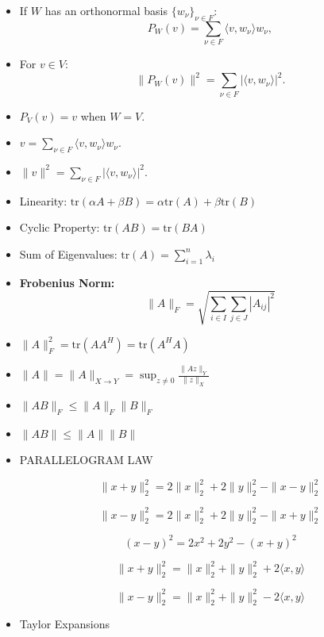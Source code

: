 \documentclass{article}
\begin{document}
\begin{itemize}
 \item If \( W \) has an orthonormal basis \( \{ w_\nu \}_{\nu \in F} \):
    \[
    P_W(v) = \sum_{\nu \in F} \langle v, w_\nu \rangle w_\nu,
    \]

 \item For \( v \in V \):
    \[
    \| P_W(v) \|^2 = \sum_{\nu \in F} |\langle v, w_\nu \rangle|^2.
    \]

 \item $P_V(v) = v$ when $W = V$.

 \item $v = \sum_{\nu \in F} \langle v, w_\nu \rangle w_\nu$.

 \item $\| v \|^2 = \sum_{\nu \in F} |\langle v, w_\nu \rangle|^2$.

 \item Linearity: $\text{tr}(\alpha A + \beta B) = \alpha \text{tr}(A) + \beta \text{tr}(B)$
    \item Cyclic Property: $\text{tr}(AB) = \text{tr}(BA)$
    \item Sum of Eigenvalues: $\text{tr}(A) = \sum_{i=1}^{n} \lambda_i$
 
\item \textbf{Frobenius Norm:}
    \[
    \| A \|_F = \sqrt{\sum_{i \in I} \sum_{j \in J} |A_{ij}|^2}
    \]

 \item 
    $
    \| A \|_F^2 = \text{tr}(AA^H) = \text{tr}(A^H A)
   $

\item 
$
\|A\| = \|A\|_{X \rightarrow Y} = \sup_{z \neq 0} \frac{\|Az\|_Y}{\|z\|_X}
$

\item 
$
\|AB\|_F \leq \|A\|_F \|B\|_F
$

\item $
\|AB\| \leq \|A\| \|B\|
$


\item PARALLELOGRAM LAW

\[
\|x + y\|^2_2 = 2 \|x\|^2_2 + 2 \|y\|^2_2 - \|x - y\|^2_2
\]

\[
\|x - y\|^2_2 = 2 \|x\|^2_2 + 2 \|y\|^2_2 - \|x + y\|^2_2
\]

\[
(x - y)^2 = 2x^2 + 2y^2 - (x + y)^2
\]

\[ \|x + y\|_2^2 = \|x\|_2^2 + \|y\|_2^2 + 2 \langle x, y \rangle \]

\[ \|x - y\|_2^2 = \|x\|_2^2 + \|y\|_2^2 - 2 \langle x, y \rangle \]


\item Taylor Expansions
\begin{itemize}


\end{itemize}
\end{itemize}
\end{document}
